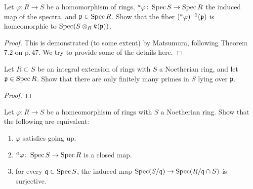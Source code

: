 \begin{problem}
Let $\varphi\colon R\to S$ be a homomorphism of rings,
$\prescript{a}{}{\varphi}\colon \operatorname{Spec} S\to\operatorname{Spec} R$ the induced map of the
spectra, and $\mathfrak{p}\in\operatorname{Spec} R$. Show that the fiber
$(\prescript{a}{}{\varphi})^{-1}(\mathfrak{p})$ is homeomorphic to
$\operatorname{Spec}(S\otimes_R k(\mathfrak{p}))$.
\end{problem}
\begin{proof}
This is demonstrated (to some extent) by Matsumura, following Theorem 7.2
on p.\,47. We try to provide some of the details here.
\end{proof}
\newpage
\begin{problem}
Let $R\subset S$ be an integral extension of rings with $S$ a Noetherian
ring, and let $\mathfrak{p}\in\operatorname{Spec} R$. Show that there are only finitely
many primes in $S$ lying over $\mathfrak{p}$.
\end{problem}
\begin{proof}
\end{proof}
\newpage
\begin{problem}
Let $\varphi\colon R\to S$ be a homeomorphism of rings with $S$ a
Noetherian ring. Show that the following are equivalent:
\begin{enumerate}[label=(\roman*)]
\item $\varphi$ satisfies going up.
\item $\prescript{a}{}\varphi\colon\operatorname{Spec} S\to\operatorname{Spec} R$ is a closed map.
\item for every $\mathfrak{q}\in\operatorname{Spec} S$, the induced map
  $\operatorname{Spec}(S/\mathfrak{q})\to\operatorname{Spec}(R/\mathfrak{q}\cap S)$ is surjective.
\end{enumerate}
\end{problem}
